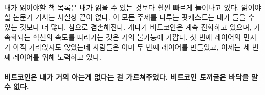 \paragraph{}
내가 읽어야할 책 목록은 내가 읽을 수 있는 것보다 훨씬 빠르게 늘어나고 있다. 
읽어야 할 논문가 기사는 사실상 끝이 없다.
이 모든 주제를 다루는 팟캐스트는 내가 들을 수 있는 것보다 더 많다. 
참으로 겸손해진다.
게다가 비트코인은 계속 진화하고 있으며, 가속화되는 혁신의 속도를 따라가는 것은 거의 불가능에 가깝다.
첫 번째 레이어의 먼지가 아직 가라앉지도 않았는데 사람들은 이미 두 번째 레이어를 만들었고, 이제는 세 번째 레이어를 위해 노력하고 있다.

\paragraph{비트코인은 내가 거의 아는게 없다는 걸 가르쳐주었다. 비트코인 토끼굴은 바닥을 알 수 없다.}
%
%
%
%
%
